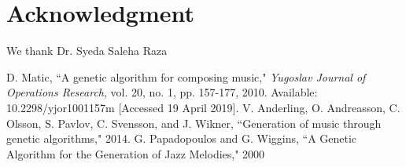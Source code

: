 \documentclass[conference]{IEEEtran}
\begin{document}
\section*{Acknowledgment}
We thank Dr. Syeda Saleha Raza 


\begin{thebibliography}{00}
 D. Matic, ``A genetic algorithm for composing music," \textit{Yugoslav Journal of Operations Research}, vol. 20, no. 1, pp. 157-177, 2010. Available: 10.2298/yjor1001157m [Accessed 19 April 2019].
V. Anderling, O. Andreasson, C. Olsson, S. Pavlov, C. Svensson, and J. Wikner, ``Generation of music through genetic algorithms," 2014.
G. Papadopoulos and G. Wiggins, ``A Genetic Algorithm for the Generation of Jazz Melodies," 2000
\end{thebibliography}
\end{document}
